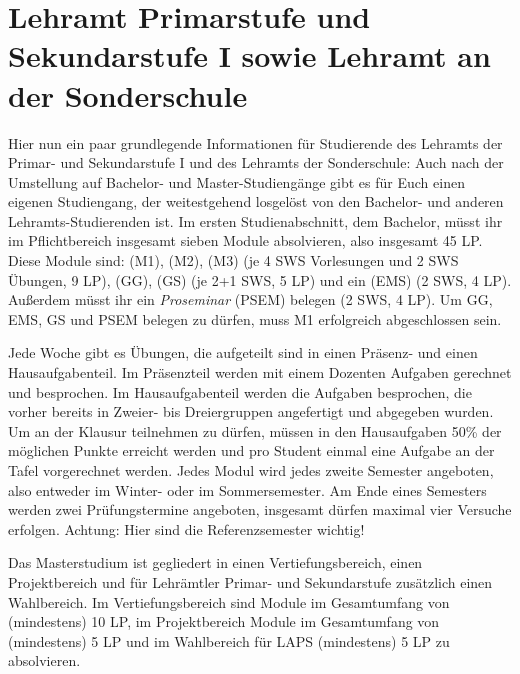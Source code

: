 \section{Lehramt Primarstufe und Sekundarstufe I sowie Lehramt an der
Sonderschule}

Hier nun ein paar grundlegende Informationen für Studierende des Lehramts der
Primar- und Sekundarstufe I und des Lehramts der Sonderschule: Auch nach der
Umstellung auf Bachelor- und Master-Studiengänge gibt es für Euch einen eigenen
Studiengang, der weitestgehend losgelöst von den Bachelor- und anderen
Lehramts-Studierenden ist. Im ersten Studienabschnitt, dem Bachelor, müsst ihr
im Pflichtbereich insgesamt sieben Module absolvieren, also insgesamt 45 LP.
Diese Module sind:  (M1),  (M2),  (M3) (je 4 SWS Vorlesungen
und 2 SWS Übungen, 9 LP),  (GG),
 (GS) (je 2+1 SWS, 5 LP) und ein
 (EMS) (2 SWS, 4 LP). Außerdem müsst ihr ein
\emph{Proseminar} (PSEM) belegen (2 SWS, 4 LP). Um GG, EMS, GS und PSEM belegen
zu dürfen, muss M1 erfolgreich abgeschlossen sein.

Jede Woche gibt es Übungen, die aufgeteilt sind in einen Präsenz- und einen
Hausaufgabenteil. Im Präsenzteil werden mit einem Dozenten Aufgaben gerechnet
und besprochen. Im Hausaufgabenteil werden die Aufgaben besprochen, die vorher
bereits in Zweier- bis Dreiergruppen angefertigt und abgegeben wurden.  Um an
der Klausur teilnehmen zu dürfen, müssen in den Hausaufgaben 50\% der möglichen
Punkte erreicht werden und pro Student einmal eine Aufgabe an der Tafel
vorgerechnet werden. Jedes Modul wird jedes zweite Semester angeboten, also
entweder im Winter- oder im Sommersemester. Am Ende eines Semesters werden zwei
Prüfungstermine angeboten, insgesamt dürfen maximal vier Versuche erfolgen.
Achtung: Hier sind die Referenzsemester wichtig!

Das Masterstudium ist gegliedert in einen Vertiefungsbereich, einen
Projektbereich und für Lehrämtler Primar- und Sekundarstufe zusätzlich einen
Wahlbereich. Im Vertiefungsbereich sind Module im Gesamtumfang von (mindestens)
10 LP, im Projektbereich Module im Gesamtumfang von (mindestens) 5 LP und im
Wahlbereich für LAPS (mindestens) 5 LP zu absolvieren. 

